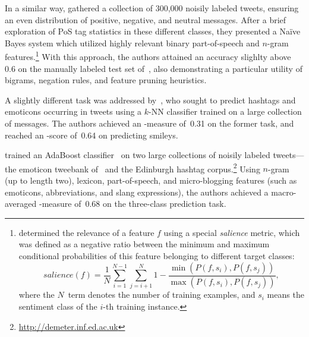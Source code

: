 In a similar way, \citet{Pak:10} gathered a collection of 300,000
noisily labeled tweets, ensuring an even distribution of positive,
negative, and neutral messages.  After a brief exploration of PoS tag
statistics in these different classes, they presented a Na{\"i}ve
Bayes system which utilized highly relevant binary part-of-speech and
$n$-gram features.\footnote{\citet{Pak:10} determined the relevance of
  a feature $f$ using a special \emph{salience} metric, which was
  defined as a negative ratio between the minimum and maximum
  conditional probabilities of this feature belonging to different
  target classes:
  \begin{equation*}
    salience(f) = \frac{1}{N}\sum_{i=1}^{N-1}\sum_{j=i+1}^N 1 - \frac{\min(P(f, s_i), P(f, s_j))}{\max(P(f, s_i), P(f, s_j))},
  \end{equation*}
  where the $N$~term denotes the number of training examples, and
  $s_i$ means the sentiment class of the $i$-th training instance.}
With this approach, the authors attained an accuracy slighlty above
0.6 on the manually labeled test set of~\citet{Go:09}, also
demonstrating a particular utility of bigrams, negation rules, and
feature pruning heuristics.

A slightly different task was addressed by~\citet{Davidov:10}, who
sought to predict hashtags and emoticons occurring in tweets using a
$k$-NN classifier trained on a large collection of messages.  The
authors achieved an \F-measure of~0.31 on the former task, and reached
an \F-score of~0.64 on predicting smileys.

\citet{Kouloumpis:11} trained an AdaBoost
classifier~\cite{Schapire:00} on two large collections of noisily
labeled tweets---the emoticon tweebank of~\citet{Go:09} and the
Edinburgh hashtag corpus.\footnote{\url{http://demeter.inf.ed.ac.uk}}
Using $n$-gram (up to length two), lexicon, part-of-speech, and
micro-blogging features (such as emoticons, abbreviations, and slang
expressions), the authors achieved a macro-averaged \F-measure of~0.68
on the three-class prediction task.


